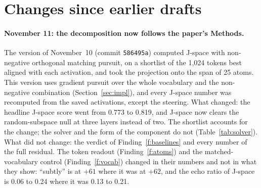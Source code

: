 \documentclass[11pt]{article}
\begin{document}
\section{Changes since earlier drafts}\label{app:changes}
\paragraph{November 11: the decomposition now follows the paper's Methods.} The version of November~10 (commit
\texttt{586495a}) computed J-space with non-negative orthogonal matching pursuit, on a shortlist of the 1{,}024 tokens best
aligned with each activation, and took the projection onto the span of 25 atoms. This version uses gradient pursuit over
the whole vocabulary and the non-negative combination (Section~\ref{sec:impl}), and every J-space number was recomputed
from the saved activations, except the steering. What changed: the headline J-space score went from 0.773 to 0.819, and
J-space now clears the random-subspace null at three layers instead of two. The shortlist accounts for the change; the
solver and the form of the component do not (Table~\ref{tab:solver}). What did not change: the verdict of
Finding~\ref{f:baselines} and every number of the full residual. The token readout (Finding~\ref{f:atoms}) and the matched-vocabulary control (Finding~\ref{f:vocab})
changed in their numbers and not in what they show: ``subtly'' is at $+61$ where it was at $+62$, and the echo ratio of
J-space is 0.06 to 0.24 where it was 0.13 to 0.21.
\end{document}
